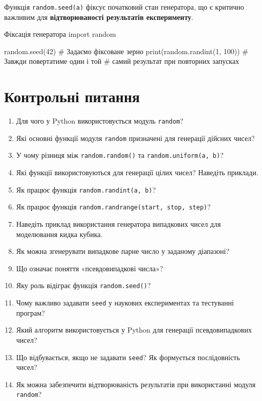 Функція \texttt{random.seed(a)} фіксує початковий стан генератора, що є критично важливим для \textbf{відтворюваності результатів експерименту}.

\begin{py}{Фіксація генератора}
import random

random.seed(42)  # Задаємо фіксоване зерно
print(random.randint(1, 100))  # Завжди повертатиме один і той
                               # самий результат при повторних запусках
\end{py}

\section*{Контрольні питання}

\begin{enumerate}
	\item Для чого у Python використовується модуль \texttt{random}?
	\item Які основні функції модуля \texttt{random} призначені для генерації дійсних чисел?
	\item У чому різниця між \texttt{random.random()} та \texttt{random.uniform(a, b)}?
	\item Які функції використовуються для генерації цілих чисел? Наведіть приклади.
	\item Як працює функція \texttt{random.randint(a, b)}?
	\item Як працює функція \texttt{random.randrange(start, stop, step)}?
	\item Наведіть приклад використання генератора випадкових чисел для моделювання кидка кубика.
	\item Як можна згенерувати випадкове парне число у заданому діапазоні?
	\item Що означає поняття «псевдовипадкові числа»?
	\item Яку роль відіграє функція \texttt{random.seed()}?
	\item Чому важливо задавати \texttt{seed} у наукових експериментах та тестуванні програм?
	\item Який алгоритм використовується у Python для генерації псевдовипадкових чисел?
	\item Що відбувається, якщо не задавати \texttt{seed}? Як формується послідовність чисел?
	\item Як можна забезпечити відтворюваність результатів при використанні модуля \texttt{random}?
\end{enumerate}

